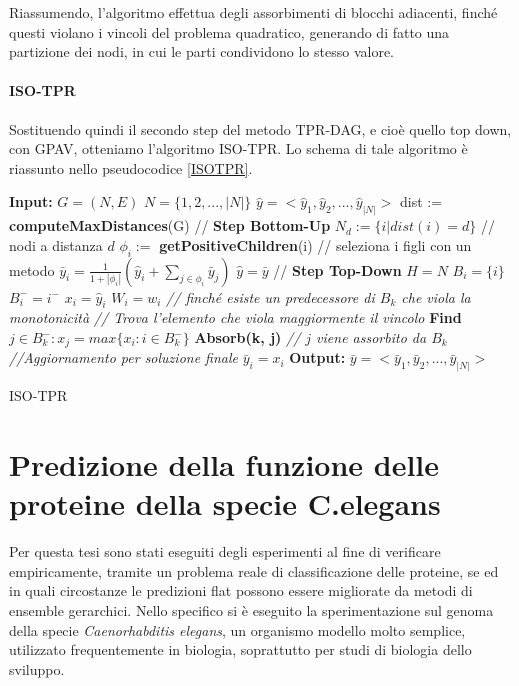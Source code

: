 \documentclass[12pt]{report}
\begin{document}
Riassumendo, l'algoritmo effettua degli assorbimenti di blocchi adiacenti, finché questi violano i vincoli del problema quadratico, generando di fatto una partizione dei nodi, in cui le parti condividono lo stesso valore.

\subsubsection{ISO-TPR}
Sostituendo quindi il secondo step del metodo TPR-DAG, e cioè quello top down, con GPAV, otteniamo l'algoritmo ISO-TPR. Lo schema di tale algoritmo è riassunto nello pseudocodice \ref{ISOTPR}.

\begin{algorithm}[!htp]

\begin{algorithmic}[1]
\State \textbf{Input: }
\State $G = (N, E)$
\State $N = \{1, 2, ..., |N|\} $ 
\State $\hat{y} = <\hat{y}_1, \hat{y}_2, ...,\hat{y}_{|N|}>$
\State dist := \textbf{computeMaxDistances}(G)
\State // \textbf{Step Bottom-Up}
\State $N_d := \{i|dist(i) = d\}$ // nodi a distanza $d$ 
\State $\phi_i :=$  \textbf{getPositiveChildren}(i) // seleziona i figli con un metodo
\State $\bar{y}_i = \frac{1}{1 + |\phi_i|} (\hat{y}_i + \sum_{j \in \phi_i} \bar{y}_j)$
\EndFor
\EndFor
\State $\hat{y} = \bar{y}$
\State // \textbf{Step Top-Down}
\State $ H = N $
\State $B_i = \{i\}$ 
\State $B_i^{-} = i^{-}$
\State $x_i = \hat{y}_i$
\State $W_i = w_i$
\EndFor
{}
\State \emph{// finché esiste un predecessore di $B_{k}$ che viola la monotonicità}
\State \emph{// Trova l'elemento che viola maggiormente il vincolo}
\State \textbf{Find} $j \in B_k^{-}: x_j = max\{x_i : i \in B_k^{-}\}$ 
\State \textbf{Absorb(k, j)} \emph{// $j$ viene assorbito da $B_k$}
\EndWhile
\EndFor
\State \emph{//Aggiornamento per soluzione finale }  
\State $\bar{y}_i = x_i$  
\EndFor
\EndFor
\EndProcedure
\State \textbf{Output: }
\State $\bar{y} = <\bar{y}_1, \bar{y}_2, ...,\bar{y}_{|N|}>$
\end{algorithmic}
\caption{ISO-TPR}
\label{ISOTPR}
\end{algorithm}



\chapter{Predizione della funzione delle proteine della specie C.elegans}
Per questa tesi sono stati eseguiti degli esperimenti al fine di verificare empiricamente, tramite un problema reale di classificazione delle proteine, se ed in quali circostanze le predizioni flat possono essere migliorate da metodi di ensemble gerarchici. Nello specifico si è eseguito la sperimentazione sul genoma della specie \textit{Caenorhabditis elegans}, un organismo modello molto semplice, utilizzato frequentemente in biologia, soprattutto per studi di biologia dello sviluppo\cite{hodgkin}.
\newline
\newline
\end{document}
